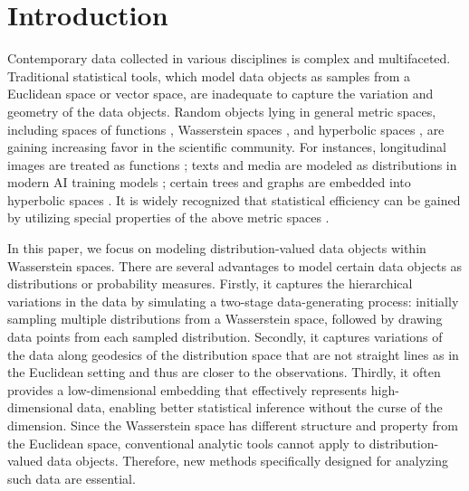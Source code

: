 \documentclass{imsart}
\numberwithin{equation}{section}
\begin{document}
\begin{frontmatter}
\begin{keyword}[class=MSC]
\end{keyword}

\begin{keyword}
\end{keyword}


\end{frontmatter}


\section{Introduction}

Contemporary data collected in various disciplines is complex and multifaceted. Traditional statistical tools, which model data objects as samples from a Euclidean space or vector space, are inadequate to capture the variation and geometry of the data objects.
Random objects lying in general metric spaces, including spaces of functions \citep{wang2016functional}, Wasserstein spaces \citep{muzellec2018generalizing}, and hyperbolic spaces \citep{zhou2021hyperbolic}, are gaining increasing favor in the scientific community. 
For instances, longitudinal images are treated as functions \cite{wang2016functional}; texts and media are modeled as distributions in modern AI training models \cite{ghorbani2020distributional, chan2022data}; certain trees and graphs are embedded into hyperbolic spaces \citep{chami2020trees}. 
It is widely recognized that statistical efficiency can be gained by utilizing special properties of the above metric spaces \citep{bigot2020statistical}.  


In this paper, we focus on modeling distribution-valued data objects within Wasserstein spaces. 
There are several advantages to model certain data objects as distributions or probability measures. 
Firstly, it captures the hierarchical variations in the data by simulating a two-stage data-generating process: initially sampling multiple distributions from a Wasserstein space, followed by drawing data points from each sampled distribution.
Secondly, it captures variations of the data along geodesics of the distribution space that are not straight lines as in the Euclidean setting and thus are closer to the observations. Thirdly, it often provides a low-dimensional embedding that effectively represents high-dimensional data, enabling better statistical inference without the curse of the dimension.
Since the Wasserstein space has different structure and property from the Euclidean space, conventional analytic tools cannot apply to distribution-valued data objects. Therefore, new methods specifically designed for analyzing such data are essential.
\end{document}
